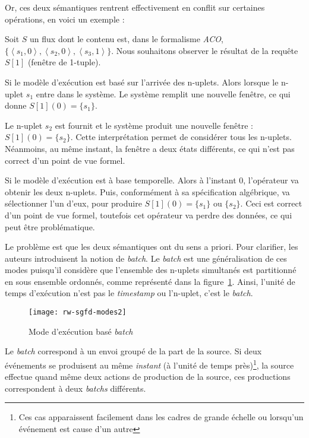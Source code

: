 Or, ces deux sémantiques rentrent effectivement en conflit sur certaines opérations, en voici un exemple :
\begin{example}\label{ex:rw:sgfd:batches}
 Soit $S$ un flux dont le contenu est, dans le formalisme \textit{ACO}, $\{\left<s_1,0\right>, \left<s_2,0\right>, \left<s_3,1\right>\}$. Nous souhaitons observer le résultat de la requête $S[1]$ (fenêtre de 1-tuple).

Si le modèle d'exécution est basé sur l'arrivée des n-uplets. Alors lorsque le n-uplet $s_1$ entre dans le système. Le système remplit une nouvelle fenêtre, ce qui donne $S[1](0)=\{s_1\}$. 

Le n-uplet $s_2$ est fournit et le système produit une nouvelle fenêtre : $S[1](0)=\{s_2\}$. Cette interprétation permet de considérer tous les n-uplets. Néanmoins, au même instant, la fenêtre a deux états différents, ce qui n'est pas correct d'un point de vue formel.

Si le modèle d'exécution est à base temporelle. Alors à l'instant 0, l'opérateur va obtenir les deux n-uplets. Puis, conformément à sa spécification algébrique, va sélectionner l'un d'eux, pour produire $S[1](0) = \{s_1\}$ ou $\{s_2\}$. Ceci est correct d'un point de vue formel, toutefois cet opérateur va perdre des données, ce qui peut être problématique.
\end{example}

Le problème est que les deux sémantiques ont du sens a priori. Pour clarifier, les auteurs introduisent la notion de \textit{batch}. Le \textit{batch} est une généralisation de ces modes puisqu'il considère que l'ensemble des n-uplets simultanés est partitionné en sous ensemble ordonnés, comme représenté dans la figure~\ref{fig:rw:sgfd:mode:batch}. Ainsi, l'unité de temps d'exécution n'est pas le \textit{timestamp} ou l'n-uplet, c'est le \textit{batch}.
\begin{figure}[ht]
    \centering
		\texttt{[image: rw-sgfd-modes2]}
    \caption{Mode d'exécution basé \textit{batch}}\label{fig:rw:sgfd:mode:batch}
\end{figure}

Le \textit{batch} correspond à un envoi groupé de la part de la source. Si deux événements se produisent au même \textit{instant} (à l'unité de temps près)\footnote{Ces cas apparaissent facilement dans les cadres de grande échelle ou lorsqu'un événement est cause d'un autre}, la source effectue quand même deux actions de production de la source, ces productions correspondent à deux \textit{batchs} différents.

